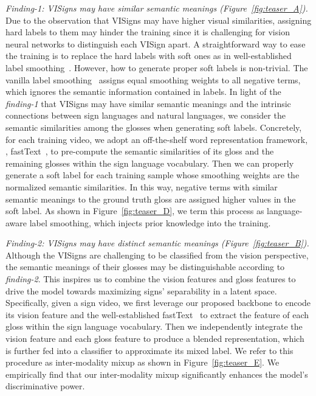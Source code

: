 \documentclass[10pt,twocolumn,letterpaper]{article}
\begin{document}
\textit{Finding-1: VISigns may have similar semantic meanings (Figure~\ref{fig:teaser_A}).}
Due to the observation that VISigns may have higher visual similarities, assigning hard labels to them may hinder the training since it is challenging for vision neural networks to distinguish each VISign apart. 
A straightforward way to ease the training is to replace the hard labels with soft ones as in well-established label smoothing~\cite{szegedy2016rethinking, he2019bag}.
However, how to generate proper soft labels is non-trivial.
The vanilla label smoothing~\cite{szegedy2016rethinking, he2019bag} assigns equal smoothing weights to all negative terms, which ignores the semantic information contained in labels.
In light of the \textit{finding-1} that VISigns may have similar semantic meanings and the intrinsic connections between sign languages and natural languages, we consider the semantic similarities among the glosses when generating soft labels. 
Concretely, for each training video, we adopt an off-the-shelf word representation framework, \ie, fastText~\cite{mikolov2018advances}, to pre-compute the semantic similarities of its gloss and the remaining glosses within the sign language vocabulary. 
Then we can properly generate a soft label for each training sample whose smoothing weights are the normalized semantic similarities. 
In this way, negative terms with similar semantic meanings to the ground truth gloss are assigned higher values in the soft label.
As shown in Figure~\ref{fig:teaser_D}, we term this process as language-aware label smoothing, which injects prior knowledge into the training.


\textit{Finding-2: VISigns may have distinct semantic meanings (Figure~\ref{fig:teaser_B}).} Although the VISigns are challenging to be classified from the vision perspective, the semantic meanings of their glosses may be distinguishable according to \textit{finding-2}. This inspires us to combine the vision features and gloss features to drive the model towards maximizing signs' separability in a latent space. Specifically, given a sign video, we first leverage our proposed backbone to encode its vision feature and the well-established fastText~\cite{mikolov2018advances} to extract the feature of each gloss within the sign language vocabulary. Then we independently integrate the vision feature and each gloss feature to produce a blended representation, which is further fed into a classifier to approximate its mixed label. We refer to this procedure as inter-modality mixup as shown in Figure~\ref{fig:teaser_E}. We empirically find that our inter-modality mixup significantly enhances the model's discriminative power. 
\end{document}
